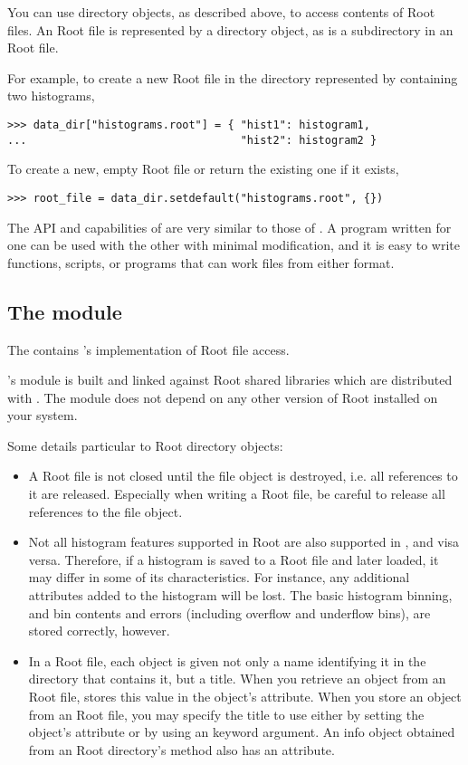 You can use directory objects, as described above, to access contents of
Root files.  An Root file is represented by a directory object, as is a
subdirectory in an Root file.

For example, to create a new Root file in the directory represented by
 containing two histograms,
\begin{verbatim}
>>> data_dir["histograms.root"] = { "hist1": histogram1,
...                                 "hist2": histogram2 }
\end{verbatim}
To create a new, empty Root file or return the existing one if it
exists,
\begin{verbatim}
>>> root_file = data_dir.setdefault("histograms.root", {})
\end{verbatim}

The API and capabilities of  are very similar to those
of .  A program written for one can be used
with the other with minimal modification, and it is easy to write
functions, scripts, or programs that can work files from either format.


\subsection{The  module}

The  contains \pyhep's implementation of Root file
access.  

\pyhep's module  is built and linked against Root shared
libraries which are distributed with \pyhep.  The module does not depend
on any other version of Root installed on your system.

Some details particular to Root directory objects:
\begin{itemize}
 \item A Root file is not closed until the file object is destroyed,
 i.e. all references to it are released.  Especially when writing a Root
 file, be careful to release all references to the file object.

 \item Not all histogram features supported in Root are also supported
 in \pyhep, and visa versa.  Therefore, if a histogram is saved to a
 Root file and later loaded, it may differ in some of its
 characteristics.  For instance, any additional attributes added to the
 histogram will be lost.  The basic histogram binning, and bin contents
 and errors (including overflow and underflow bins), are stored
 correctly, however.

 \item In a Root file, each object is given not only a name identifying
 it in the directory that contains it, but a title.  When you retrieve
 an object from an Root file, \pyhep stores this value in the object's
  attribute.  When you store an object from an Root file,
 you may specify the title to use either by setting the object's
  attribute or by using an  keyword argument.
 An info object obtained from an Root directory's 
 method also has an  attribute.

\end{itemize}


